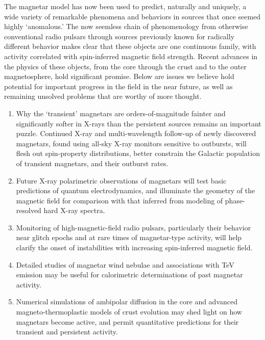 
The magnetar model has now been used to predict, naturally and uniquely, 
a wide variety of remarkable phenomena and behaviors in sources that 
once seemed highly `anomalous.'
The now seemless chain of phenomenology from otherwise conventional radio pulsars through
sources previously known for radically different behavior makes clear that these objects are
one continuous family, with activity correlated with spin-inferred
magnetic field strength.  Recent advances in
the physics of these objects, from the core through the crust and
to the outer magnetosphere, hold significant promise.
Below are issues we believe hold potential for important progress
in the field in the near future, as well as remaining unsolved problems that are
worthy of more thought.

\begin{issues}
\begin{enumerate}

\item Why the `transient' magnetars are orders-of-magnitude fainter and significantly softer in X-rays
than the persistent sources remains an important puzzle.  
Continued X-ray and multi-wavelength follow-up of newly discovered magnetars, found using
all-sky X-ray monitors sensitive to outbursts, will
flesh out spin-property distributions, better constrain the Galactic
population of transient magnetars, and their outburst rates.

\item Future X-ray polarimetric observations of magnetars will
test basic predictions of quantum electrodynamics, and
illuminate the geometry of the magnetic field for comparison with that
inferred from modeling of phase-resolved hard X-ray spectra.

\item Monitoring of high-magnetic-field radio pulsars, particularly their behavior near
glitch epochs and at rare times of magnetar-type activity, will help clarify the 
onset of instabilities with increasing spin-inferred magnetic field.

\item Detailed studies of magnetar wind nebulae and associations with TeV
emission may be useful for calorimetric
determinations of past magnetar activity.

\item Numerical simulations 
of ambipolar diffusion in the core and advanced magneto-thermoplastic models of crust evolution may shed light on how magnetars become active, and permit quantitative predictions for their transient and persistent activity.


\end{enumerate}
\end{issues}
